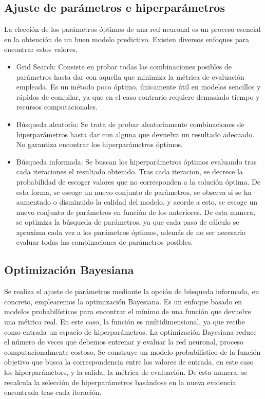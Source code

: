 \documentclass{report}
\begin{document}
\subsection{Ajuste de parámetros e hiperparámetros}

La elección de los parámetros óptimos de una red neuronal es un proceso
esencial en la obtención de un buen modelo predictivo. Existen diversos
enfoques para encontrar estos valores.

\begin{itemize}
\item
  Grid Search: Consiste en probar todas las combinaciones posibles de
  parámetros hasta dar con aquella que minimiza la métrica de evaluación
  empleada. Es un método poco óptimo, únicamente útil en modelos
  sencillos y rápidos de compilar, ya que en el caso contrario requiere
  demasiado tiempo y recursos computacionales. 
\item
  Búsqueda aleatoria: Se trata de probar aleatoriamente combinaciones de
  hiperparámetros hasta dar con alguna que devuelva un resultado
  adecuado. No garantiza encontrar los hiperparámetros óptimos.
\item
  Búsqueda informada: Se buscan los hiperparámetros óptimos evaluando
  tras cada iteraciones el resultado obtenido. Tras cada iteracion, se
  decrece la probabilidad de escoger valores que no corresponden a la
  solución óptima. De esta forma, se escoge un nuevo conjunto de
  parámetros, se observa si se ha aumentado o disminuido la calidad del
  modelo, y acorde a esto, se escoge un nuevo conjunto de parámetros en
  función de los anteriores. De esta manera, se optimiza la búsqueda de
  parámetros, ya que cada paso de cálculo se aproxima cada vez a los
  parámetros óptimos, además de no ser necesario evaluar todas las
  combinaciones de parámetros posibles. 
\end{itemize}

\subsection{Optimización Bayesiana}

Se realiza el ajuste de parámetros mediante la opción de búsqueda
informada, en concreto, emplearemos la optimización Bayesiana.
Es un enfoque basado en modelos probabilísticos para encontrar el mínimo
de una función que devuelve una métrica real. En este caso, la función
es multidimensional, ya que recibe como entrada un espacio de
hiperparámetros. La optimización Bayesiana reduce el número de veces que
debemos entrenar y evaluar la red neuronal, proceso computacionalmente
costoso. Se construye un modelo probabilístico de la función objetivo
que busca la correspondencia entre los valores de entrada, en este caso
los hiperparámetors, y la salida, la métrica de evaluación. De esta
manera, se recalcula la selección de hiperparámetros basándose en la
nueva evidencia encontrada tras cada iteración.
\end{document}

